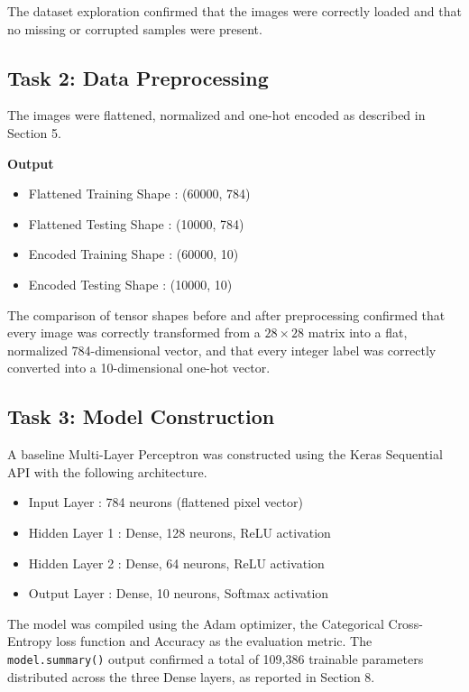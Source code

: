 \documentclass[11pt,a4paper]{article}
\begin{document}
\vspace{0.3cm}

The dataset exploration confirmed that the images were correctly loaded and that no missing or corrupted samples were present.


\subsection*{Task 2: Data Preprocessing}

The images were flattened, normalized and one-hot encoded as described in Section 5.

\textbf{Output}

\begin{itemize}
\item Flattened Training Shape : (60000, 784)
\item Flattened Testing Shape : (10000, 784)
\item Encoded Training Shape : (60000, 10)
\item Encoded Testing Shape : (10000, 10)
\end{itemize}

\vspace{0.3cm}

The comparison of tensor shapes before and after preprocessing confirmed that every image was correctly transformed from a $28\times28$ matrix into a flat, normalized 784-dimensional vector, and that every integer label was correctly converted into a 10-dimensional one-hot vector.


\subsection*{Task 3: Model Construction}

A baseline Multi-Layer Perceptron was constructed using the Keras Sequential API with the following architecture.

\begin{itemize}
\item Input Layer : 784 neurons (flattened pixel vector)
\item Hidden Layer 1 : Dense, 128 neurons, ReLU activation
\item Hidden Layer 2 : Dense, 64 neurons, ReLU activation
\item Output Layer : Dense, 10 neurons, Softmax activation
\end{itemize}

The model was compiled using the Adam optimizer, the Categorical Cross-Entropy loss function and Accuracy as the evaluation metric. The \texttt{model.summary()} output confirmed a total of 109{,}386 trainable parameters distributed across the three Dense layers, as reported in Section 8.
\end{document}
